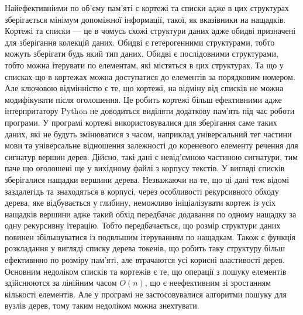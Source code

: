 Найефективніими по об'єму пам'яті є кортежі та списки адже в цих структурах зберігається
мінімум допоміжної інформації, такої, як вказівники на нащадків. Кортежі та списки --- це
в чомусь схожі структури даних адже обидві призначені для зберігання колекцій даних.
Обидві є гетерогенними структурами, тобто можуть зберігати будь який тип даних.
Обидві є послідовними структурами, тобто можна ітерувати по елементам, які містяться в
цих структурах. Та що у списках що в кортежах можна доступатися до елементів за порядковим
номером. Але ключовою відмінністю є те, що кортежі, на відміну від списків не можна
модифікувати після оголошення. Це робить кортежі більш ефективними адже інтерпритатору
Python не доводиться виділяти додаткову пам'ять під час роботи програми.
У програмі кортежі використовувалися для зберігання саме таких даних, які не будуть
змінюватися з часом, наприклад універсальний тег частини мови та
універсальне відношення залежності до кореневого елементу речення для сигнатур
вершин дерев. Дійсно, такі дані є невід'ємною частиною сигнатури, тим паче що
оголошені ще у вихідному файлі з корпусу текстів. У вигляді списків зберігалися
нащадки вершини дерева. Незважаючи на те, що ці дані теж відомі заздалегідь та
знаходяться в корпусі, через особливості рекурсивного обходу дерева, яке відбувається
у глибину, неможливо ініціалізувати кортеж із усіх нащадків вершини адже
такий обхід передбачає додавання по одному нащадку за одну рекурсивну ітерацію.
Тобто передбачається, що розмір структури даних повинен збільшуватися із подвльшим
ітеруванням по нащадкам. Також є функція розкладання у вигляді списку дерева токенів,
що робить таку структуру більш ефективною по розміру пам'яті, але втрачаются усі
корисні властивості дерев. Основним недоліком списків та кортежів є те, що операції
з пошуку елементів здійснюются за лінійним часом $O(n)$, що є неефективним зі
зростанням кількості елементів. Але у програмі не застосовувалися алгоритми
пошуку для вузлів дерев, тому таким недоліком можна знехтувати.

